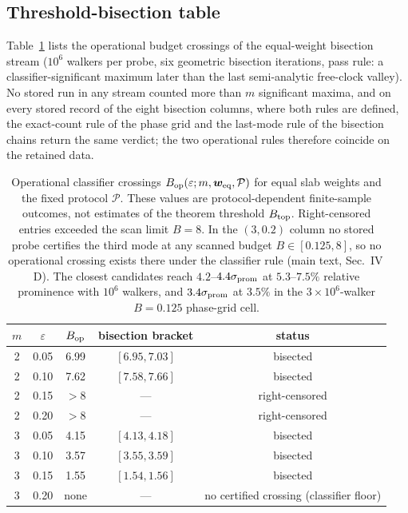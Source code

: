 \documentclass[aps,physrev,onecolumn,amsmath,amssymb,longbibliography]{revtex4-2}
\begin{document}
\subsection{Threshold-bisection table}
\label{sec:supp-numerics-thresholds}

Table~\ref{tab:supp-bop} lists the operational budget crossings of the
equal-weight bisection stream (\(10^{6}\) walkers per probe, six geometric bisection
iterations, pass rule: a classifier-significant maximum later than the
last semi-analytic free-clock valley).  No stored run in any stream counted
more than \(m\) significant maxima, and on every stored record of the eight
bisection columns, where both rules are defined, the exact-count rule of the
phase grid and the last-mode rule of the bisection chains return the same
verdict; the two operational rules therefore coincide on the retained data.

\begin{table}[t]
\caption{Operational classifier crossings
\(B_{\rm op}(\varepsilon;m,\bm w_{\rm eq},\mathcal P)\) for equal slab
weights and the fixed protocol \(\mathcal P\).
These values are protocol-dependent finite-sample outcomes, not estimates of
the theorem threshold \(B_{\rm top}\).  Right-censored
entries exceeded the scan limit \(B=8\).  In the \((3,0.2)\) column no
stored probe certifies the third mode at any scanned budget
\(B\in[0.125,8]\), so no operational crossing exists there under the
classifier rule (main text, Sec.~IV\,D).  The closest candidates reach
\(4.2\)--\(4.4\sigma_{\rm prom}\) at \(5.3\)--\(7.5\%\) relative prominence with
\(10^{6}\) walkers, and \(3.4\sigma_{\rm prom}\) at \(3.5\%\) in the
\(3\times10^{6}\)-walker \(B=0.125\) phase-grid cell.
\label{tab:supp-bop}}
\begin{ruledtabular}
\begin{tabular}{ccccc}
\(m\) & \(\varepsilon\) & \(B_{\rm op}\) & bisection bracket & status\\
\hline
2 & 0.05 & 6.99 & \([6.95,7.03]\) & bisected\\
2 & 0.10 & 7.62 & \([7.58,7.66]\) & bisected\\
2 & 0.15 & \(>8\) & --- & right-censored\\
2 & 0.20 & \(>8\) & --- & right-censored\\
3 & 0.05 & 4.15 & \([4.13,4.18]\) & bisected\\
3 & 0.10 & 3.57 & \([3.55,3.59]\) & bisected\\
3 & 0.15 & 1.55 & \([1.54,1.56]\) & bisected\\
3 & 0.20 & none & --- & no certified crossing (classifier floor)\\
\end{tabular}
\end{ruledtabular}
\end{table}
\end{document}
